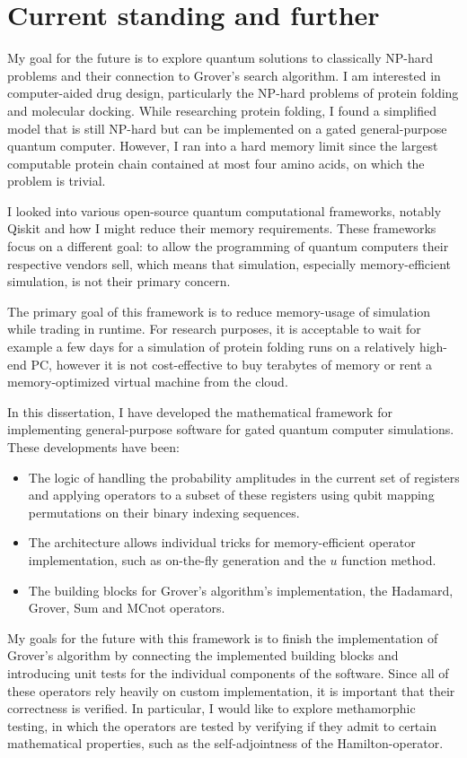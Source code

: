 \chapter{Current standing and further}

My goal for the future is to explore quantum solutions to classically NP-hard problems and their connection to Grover's search algorithm. I am interested in computer-aided drug design, particularly the NP-hard problems of protein folding and molecular docking. While researching protein folding, I found a simplified model that is still NP-hard but can be implemented on a gated general-purpose quantum computer. However, I ran into a hard memory limit since the largest computable protein chain contained at most four amino acids, on which the problem is trivial.

I looked into various open-source quantum computational frameworks, notably Qiskit and how I might reduce their memory requirements. These frameworks focus on a different goal: to allow the programming of quantum computers their respective vendors sell, which means that simulation, especially memory-efficient simulation, is not their primary concern.

The primary goal of this framework is to reduce memory-usage of simulation while trading in runtime. For research purposes, it is acceptable to wait for example a few days for a simulation of protein folding runs on a relatively high-end PC, however it is not cost-effective to buy terabytes of memory or rent a memory-optimized virtual machine from the cloud.

In this dissertation, I have developed the mathematical framework for implementing general-purpose software for gated quantum computer simulations. These developments have been:

\begin{itemize}
    \item The logic of handling the probability amplitudes in the current set of registers and applying operators to a subset of these registers using qubit mapping permutations on their binary indexing sequences.
    \item The architecture allows individual tricks for memory-efficient operator implementation, such as on-the-fly generation and the $u$ function method.
    \item The building blocks for Grover's algorithm's implementation, the Hadamard, Grover, Sum and MCnot operators.
\end{itemize}

My goals for the future with this framework is to finish the implementation of Grover's algorithm by connecting the implemented building blocks and introducing unit tests for the individual components of the software. Since all of these operators rely heavily on custom implementation, it is important that their correctness is verified. In particular, I would like to explore methamorphic testing, in which the operators are tested by verifying if they admit to certain mathematical properties, such as the self-adjointness of the Hamilton-operator.
